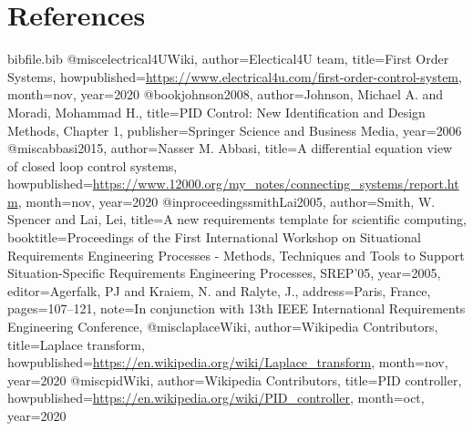 \documentclass[12pt]{article}
\begin{document}
\section{References}
\label{Sec:References}
\begin{filecontents*}{bibfile.bib}
@misc{electrical4UWiki,
author={Electical4U team},
title={First Order Systems},
howpublished={\url{https://www.electrical4u.com/first-order-control-system}},
month=nov,
year={2020}}
@book{johnson2008,
author={Johnson, Michael A. and Moradi, Mohammad H.},
title={PID Control: New Identification and Design Methods, Chapter 1},
publisher={Springer Science and Business Media},
year={2006}}
@misc{abbasi2015,
author={Nasser M. Abbasi},
title={A diﬀerential equation view of closed loop control systems},
howpublished={\url{https://www.12000.org/my\_notes/connecting\_systems/report.htm}},
month=nov,
year={2020}}
@inproceedings{smithLai2005,
author={Smith, W. Spencer and Lai, Lei},
title={A new requirements template for scientific computing},
booktitle={Proceedings of the First International Workshop on Situational Requirements Engineering Processes - Methods, Techniques and Tools to Support Situation-Specific Requirements Engineering Processes, SREP'05},
year={2005},
editor={Agerfalk, PJ and Kraiem, N. and Ralyte, J.},
address={Paris, France},
pages={107--121},
note={In conjunction with 13th IEEE International Requirements Engineering Conference,}}
@misc{laplaceWiki,
author={Wikipedia Contributors},
title={Laplace transform},
howpublished={\url{https://en.wikipedia.org/wiki/Laplace\_transform}},
month=nov,
year={2020}}
@misc{pidWiki,
author={Wikipedia Contributors},
title={PID controller},
howpublished={\url{https://en.wikipedia.org/wiki/PID\_controller}},
month=oct,
year={2020}}
\end{filecontents*}
\nocite{*}
\printbibliography[heading=none]
\end{document}
